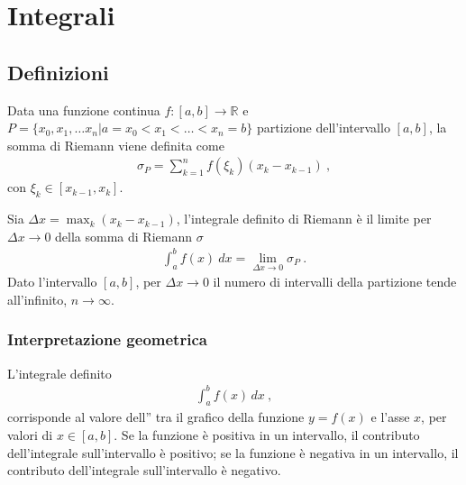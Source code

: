 \documentclass[letterpaper,10pt,italian]{jupyterBook}
\begin{document}
\chapter{Integrali}
\label{\detokenize{ch/infinitesimal_calculus/integrals:integrali}}\label{\detokenize{ch/infinitesimal_calculus/integrals:infinitesimal-calculus-integrals}}\label{\detokenize{ch/infinitesimal_calculus/integrals::doc}}

\section{Definizioni}
\label{\detokenize{ch/infinitesimal_calculus/integrals:definizioni}}\label{\detokenize{ch/infinitesimal_calculus/integrals:infinitesimal-calculus-integrals-def}}
\sphinxAtStartPar
{} Data una funzione continua \(f: [a,b] \rightarrow \mathbb{R}\) e \(P = \{ x_0, x_1, \dots x_n | a = x_0 < x_1 < \dots < x_n = b \}\) partizione dell’intervallo \([a,b]\), la somma di Riemann viene definita come
\begin{equation}\label{equation:ch/infinitesimal_calculus/integrals:infinitesimal-calculus:integrals:riemann:sum}
\begin{split}\sigma_P = \sum_{k=1}^{n} f(\xi_k) (x_{k} - x_{k-1}) \ ,\end{split}
\end{equation}
\sphinxAtStartPar
con \(\xi_k \in [x_{k-1}, x_k]\).

\sphinxAtStartPar
{} Sia \(\Delta x = \max_k (x_{k} - x_{k-1})\), l’integrale definito di Riemann è  il limite per \(\Delta x \rightarrow 0\) della somma di Riemann \(\sigma\)
\begin{equation}\label{equation:ch/infinitesimal_calculus/integrals:infinitesimal-calculus:integrals:riemann:def}
\begin{split}\int_a^b f(x) \ dx = \lim_{\Delta x \rightarrow 0} \sigma_P \ .\end{split}
\end{equation}
\sphinxAtStartPar
{} Dato l’intervallo \([a,b]\), per \(\Delta x \rightarrow 0\) il numero di intervalli della partizione tende all’infinito, \(n \rightarrow \infty\).


\subsection{Interpretazione geometrica}
\label{\detokenize{ch/infinitesimal_calculus/integrals:interpretazione-geometrica}}
\sphinxAtStartPar
L’integrale definito
\begin{equation*}
\begin{split}\int_{a}^{b} f(x) \, dx \ ,\end{split}
\end{equation*}
\sphinxAtStartPar
corrisponde al valore dell” tra il grafico della funzione \(y=f(x)\) e l’asse \(x\), per valori di \(x \in [a,b]\). Se la funzione è positiva in un intervallo, il contributo dell’integrale sull’intervallo è positivo; se la funzione è negativa in un intervallo, il contributo dell’integrale sull’intervallo è negativo.
\end{document}
